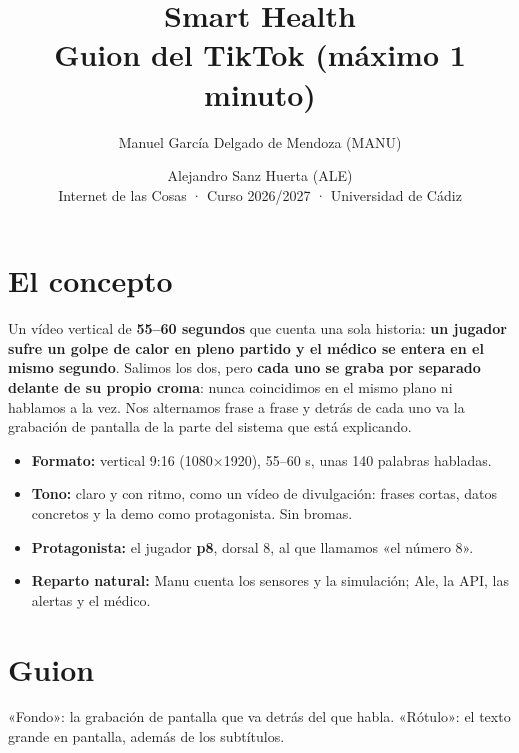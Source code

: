 \documentclass[11pt,a4paper]{article}
\title{\textbf{Smart Health}\\[2pt]\large Guion del TikTok (máximo 1 minuto)}
\author{Manuel García Delgado de Mendoza (\textcolor{manu}{MANU}) \and Alejandro Sanz Huerta (\textcolor{ale}{ALE})\\[2pt]
\small Internet de las Cosas · Curso 2026/2027 · Universidad de Cádiz}
\date{}
\newcommand{\efe}[1]{\textcolor{gris}{\small #1}}
\begin{document}
\maketitle
\vspace{-1.5em}

\section*{El concepto}

Un vídeo vertical de \textbf{55--60 segundos} que cuenta una sola historia: \textbf{un jugador sufre un golpe de calor en pleno partido y el médico se entera en el mismo segundo}. Salimos los dos, pero \textbf{cada uno se graba por separado delante de su propio croma}: nunca coincidimos en el mismo plano ni hablamos a la vez. Nos alternamos frase a frase y detrás de cada uno va la grabación de pantalla de la parte del sistema que está explicando.

\begin{itemize}[nosep]
  \item \textbf{Formato:} vertical 9:16 (1080×1920), 55--60 s, unas 140 palabras habladas.
  \item \textbf{Tono:} claro y con ritmo, como un vídeo de divulgación: frases cortas, datos concretos y la demo como protagonista. Sin bromas.
  \item \textbf{Protagonista:} el jugador \textbf{p8}, dorsal 8, al que llamamos «el número 8».
  \item \textbf{Reparto natural:} Manu cuenta los sensores y la simulación; Ale, la API, las alertas y el médico.
\end{itemize}

\section*{Guion}

\efe{«Fondo»: la grabación de pantalla que va detrás del que habla. «Rótulo»: el texto grande en pantalla, además de los subtítulos.}
\end{document}
